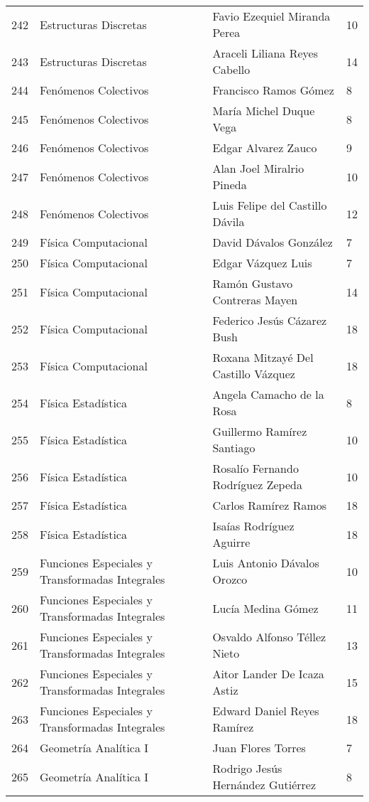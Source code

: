 \begin{table}[ht]
\begin{tabular}{rlll}
  242 & Estructuras Discretas & Favio Ezequiel Miranda Perea & 10 \\ 
  243 & Estructuras Discretas & Araceli Liliana Reyes Cabello & 14 \\ 
  244 & Fenómenos Colectivos & Francisco Ramos Gómez & 8 \\ 
  245 & Fenómenos Colectivos & María Michel Duque Vega & 8 \\ 
  246 & Fenómenos Colectivos & Edgar Alvarez Zauco & 9 \\ 
  247 & Fenómenos Colectivos & Alan Joel Miralrio Pineda & 10 \\ 
  248 & Fenómenos Colectivos & Luis Felipe del Castillo Dávila & 12 \\ 
  249 & Física Computacional & David Dávalos González & 7 \\ 
  250 & Física Computacional & Edgar Vázquez Luis & 7 \\ 
  251 & Física Computacional & Ramón Gustavo Contreras Mayen & 14 \\ 
  252 & Física Computacional & Federico Jesús Cázarez Bush & 18 \\ 
  253 & Física Computacional & Roxana Mitzayé Del Castillo Vázquez & 18 \\ 
  254 & Física Estadística & Angela Camacho de la Rosa & 8 \\ 
  255 & Física Estadística & Guillermo Ramírez Santiago & 10 \\ 
  256 & Física Estadística & Rosalío Fernando Rodríguez Zepeda & 10 \\ 
  257 & Física Estadística & Carlos Ramírez Ramos & 18 \\ 
  258 & Física Estadística & Isaías Rodríguez Aguirre & 18 \\ 
  259 & Funciones Especiales y Transformadas Integrales & Luis Antonio Dávalos Orozco & 10 \\ 
  260 & Funciones Especiales y Transformadas Integrales & Lucía Medina Gómez & 11 \\ 
  261 & Funciones Especiales y Transformadas Integrales & Osvaldo Alfonso Téllez Nieto & 13 \\ 
  262 & Funciones Especiales y Transformadas Integrales & Aitor Lander De Icaza Astiz & 15 \\ 
  263 & Funciones Especiales y Transformadas Integrales & Edward Daniel Reyes Ramírez & 18 \\ 
  264 & Geometría Analítica I & Juan Flores Torres & 7 \\ 
  265 & Geometría Analítica I & Rodrigo Jesús Hernández Gutiérrez & 8 \\ 

\end{tabular}
\end{table}
